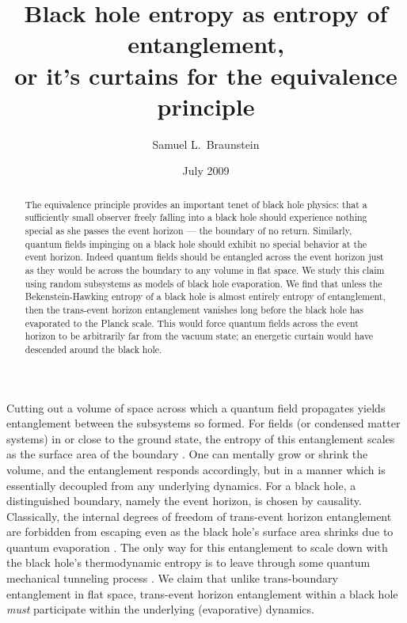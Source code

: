 \documentclass[12pt,aps,prl]{revtex4}
\begin{document}
\title{Black hole entropy as entropy of entanglement,\\
or it's curtains for the equivalence principle}

\author{Samuel L.\ Braunstein}

\date{July 2009}

\begin{abstract}
The equivalence principle provides an important tenet of black hole
physics: that a sufficiently small observer freely falling into a
black hole should experience nothing special as she passes the event
horizon --- the boundary of no return. Similarly, quantum fields
impinging on a black hole should exhibit no special behavior at the
event horizon. Indeed quantum fields should be entangled across the
event horizon just as they would be across the boundary to any volume
in flat space. We study this claim using random subsystems as models
of black hole evaporation. We find that unless the Bekenstein-Hawking
entropy of a black hole is almost entirely entropy of entanglement,
then the trans-event horizon entanglement vanishes long before the
black hole has evaporated to the Planck scale. This would force quantum
fields across the event horizon to be arbitrarily far from the vacuum
state; an energetic curtain would have descended around the black hole.
\end{abstract}

\maketitle

Cutting out a volume of space across which a quantum field propagates
yields entanglement between the subsystems so formed. For fields (or
condensed matter systems) in or close to the ground state, the
entropy of this entanglement scales as the surface area of the
boundary \cite{Eisert09}. One can mentally grow or shrink the volume,
and the entanglement responds accordingly, but in a manner which is
essentially decoupled from any underlying dynamics. For a black hole,
a distinguished boundary, namely the event horizon, is chosen by
causality. Classically, the internal degrees of freedom of trans-event
horizon entanglement are forbidden from escaping even as the black
hole's surface area shrinks due to quantum evaporation \cite{Hawking75}.
The only way for this entanglement to scale down with the black hole's
thermodynamic entropy is to leave through some quantum mechanical
tunneling process \cite{Parikh00}. We claim that unlike trans-boundary
entanglement in flat space, trans-event horizon entanglement within a
black hole {\it must\/} participate within the underlying (evaporative)
dynamics. 
\end{document}
